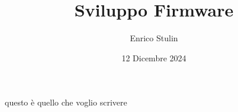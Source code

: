 \documentclass{article}
\title{Sviluppo Firmware}
\author{Enrico Stulin}
\date{12 Dicembre 2024}
\begin{document}
	\maketitle
	\newpage
	questo è quello che voglio scrivere
\end{document}
